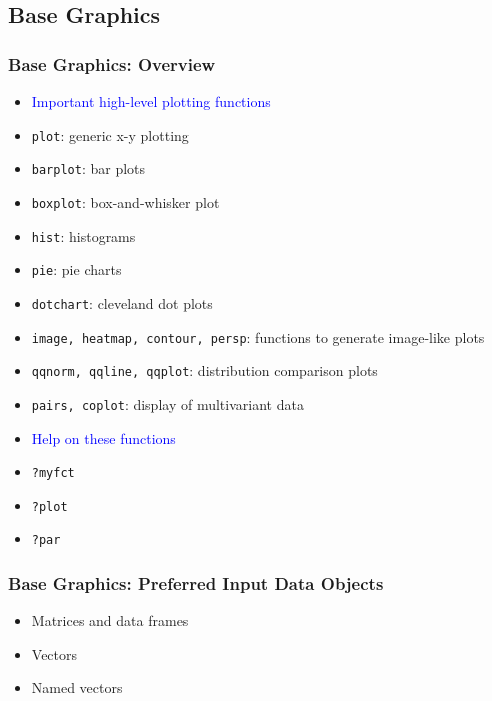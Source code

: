 \documentclass{beamer}
\newcommand{\Rfunction}[1]{{\texttt{#1}}}
\begin{document}
\subsection{Base Graphics}
\begin{frame}[containsverbatim]  
	\frametitle{Base Graphics: Overview}
\begin{itemize}
        \footnotesize
        \item[] \hspace{-0.8cm} \textcolor{blue}{Important high-level plotting functions}
        \item \Rfunction{plot}: generic x-y plotting
        \item \Rfunction{barplot}: bar plots
        \item \Rfunction{boxplot}: box-and-whisker plot
        \item \Rfunction{hist}: histograms
        \item \Rfunction{pie}: pie charts
        \item \Rfunction{dotchart}: cleveland dot plots
        \item \Rfunction{image, heatmap, contour, persp}: functions to generate image-like plots
        \item \Rfunction{qqnorm, qqline, qqplot}: distribution comparison plots
        \item \Rfunction{pairs, coplot}: display of multivariant data
        \item[] \hspace{-0.8cm} \textcolor{blue}{Help on these functions}
        \item \Rfunction{?myfct}
        \item \Rfunction{?plot}
        \item \Rfunction{?par} 
\end{itemize}
\end{frame}
\begin{frame}[containsverbatim]  
	\frametitle{Base Graphics: Preferred Input Data Objects}
\begin{itemize}
        \footnotesize
        \item Matrices and data frames
        \item Vectors
        \item Named vectors
\end{itemize}
\end{frame}
\end{document}
